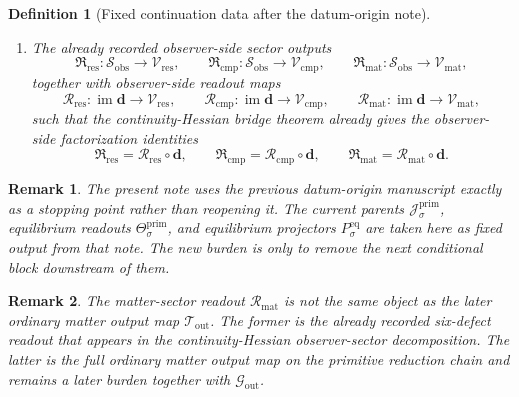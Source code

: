 \documentclass[11pt]{article}
\newcommand{\Car}{\mathrm{car}}
\newcommand{\Cur}{\mathrm{cur}}
\newcommand{\Hom}{\mathrm{hom}}
\newcommand{\ObsShell}{\mathcal S_{\mathrm{obs}}}
\newcommand{\ObsTheta}[1]{\Theta_{#1}}
\newcommand{\PrimCurrent}[1]{\mathcal J_{#1}^{\mathrm{prim}}}
\newcommand{\PrimTheta}[1]{\Theta_{#1}^{\mathrm{prim}}}
\newcommand{\EqProj}[1]{P_{#1}^{\mathrm{eq}}}
\newcommand{\DefectTuple}{\mathbf d}
\newcommand{\ObsResidualSector}{\mathfrak R_{\mathrm{res}}}
\newcommand{\ObsCompletionSector}{\mathfrak R_{\mathrm{cmp}}}
\newcommand{\ObsMatterSector}{\mathfrak R_{\mathrm{mat}}}
\newcommand{\ResidualRead}{\mathscr R_{\mathrm{res}}}
\newcommand{\CompletionRead}{\mathscr R_{\mathrm{cmp}}}
\newcommand{\MatterRead}{\mathscr R_{\mathrm{mat}}}
\newcommand{\MetricOut}{\mathscr G_{\mathrm{out}}}
\newcommand{\MatterOut}{\mathscr T_{\mathrm{out}}}
\newcommand{\ResidualTarget}{\mathcal V_{\mathrm{res}}}
\newcommand{\CompletionTarget}{\mathcal V_{\mathrm{cmp}}}
\newcommand{\MatterTarget}{\mathcal V_{\mathrm{mat}}}
\newtheorem{definition}{Definition}
\newtheorem{remark}{Remark}
\begin{document}
\begin{definition}[Fixed continuation data after the datum-origin note]
\begin{enumerate}
\begin{equation}
\begin{aligned}
    &(\mathbf 1-\EqProj{\Car})\ObsTheta{\Car}(x_{\Car}),
    (\mathbf 1-\EqProj{\Cur})\ObsTheta{\Cur}(x_{\Cur}),
    \\
    &
    (\mathbf 1-\EqProj{\Hom})\ObsTheta{\Hom}(x_{\Hom})
    \Bigr)
    \end{aligned}
    \label{eq:obs_tuple}
    \end{equation}
    on \(\ObsShell\).
    \item The already recorded observer-side sector outputs
    \[
    \ObsResidualSector:\ObsShell\to\ResidualTarget,
    \qquad
    \ObsCompletionSector:\ObsShell\to\CompletionTarget,
    \qquad
    \ObsMatterSector:\ObsShell\to\MatterTarget,
    \]
    together with observer-side readout maps
    \[
    \ResidualRead:\operatorname{im}\DefectTuple\to\ResidualTarget,
    \qquad
    \CompletionRead:\operatorname{im}\DefectTuple\to\CompletionTarget,
    \qquad
    \MatterRead:\operatorname{im}\DefectTuple\to\MatterTarget,
    \]
    such that the continuity-Hessian bridge theorem already gives the observer-side factorization identities
    \begin{equation}
    \ObsResidualSector=\ResidualRead\circ\DefectTuple,\qquad
    \ObsCompletionSector=\CompletionRead\circ\DefectTuple,\qquad
    \ObsMatterSector=\MatterRead\circ\DefectTuple.
    \label{eq:obs_factorization}
    \end{equation}
\end{enumerate}
\end{definition}

\begin{remark}
The present note uses the previous datum-origin manuscript exactly as a stopping point rather than reopening it. The current parents \(\PrimCurrent{\sigma}\), equilibrium readouts \(\PrimTheta{\sigma}\), and equilibrium projectors \(\EqProj{\sigma}\) are taken here as fixed output from that note. The new burden is only to remove the next conditional block downstream of them.
\end{remark}

\begin{remark}
The matter-sector readout \(\MatterRead\) is not the same object as the later ordinary matter output map \(\MatterOut\). The former is the already recorded six-defect readout that appears in the continuity-Hessian observer-sector decomposition. The latter is the full ordinary matter output map on the primitive reduction chain and remains a later burden together with \(\MetricOut\).
\end{remark}
\end{document}
